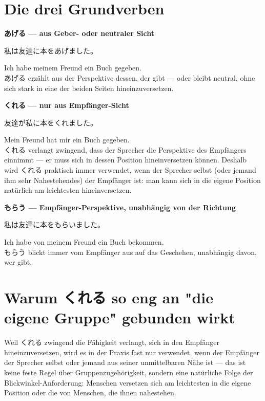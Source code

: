 \documentclass[12pt]{book}
\begin{document}
\section*{Die drei Grundverben}

\textbf{あげる — aus Geber- oder neutraler Sicht}
\par\quad 私は友達に本をあげました。\\
\par\quad Ich habe meinem Freund ein Buch gegeben.\\

あげる erzählt aus der Perspektive dessen, der gibt — oder bleibt neutral, ohne sich stark in eine der beiden Seiten hineinzuversetzen.

\textbf{くれる — nur aus Empfänger-Sicht}
\par\quad 友達が私に本をくれました。\\
\par\quad Mein Freund hat mir ein Buch gegeben.\\

くれる verlangt zwingend, dass der Sprecher die Perspektive des Empfängers einnimmt — er muss sich in dessen Position hineinversetzen können. Deshalb wird くれる praktisch immer verwendet, wenn der Sprecher selbst (oder jemand ihm sehr Nahestehendes) der Empfänger ist: man kann sich in die eigene Position natürlich am leichtesten hineinversetzen.

\textbf{もらう — Empfänger-Perspektive, unabhängig von der Richtung}
\par\quad 私は友達に本をもらいました。\\
\par\quad Ich habe von meinem Freund ein Buch bekommen.\\

もらう blickt immer vom Empfänger aus auf das Geschehen, unabhängig davon, wer gibt.

\section*{Warum くれる so eng an "die eigene Gruppe" gebunden wirkt}

Weil くれる zwingend die Fähigkeit verlangt, sich in den Empfänger hineinzuversetzen, wird es in der Praxis fast nur verwendet, wenn der Empfänger der Sprecher selbst oder jemand aus seiner unmittelbaren Nähe ist — das ist keine feste Regel über Gruppenzugehörigkeit, sondern eine natürliche Folge der Blickwinkel-Anforderung: Menschen versetzen sich am leichtesten in die eigene Position oder die von Menschen, die ihnen nahestehen.
\end{document}
